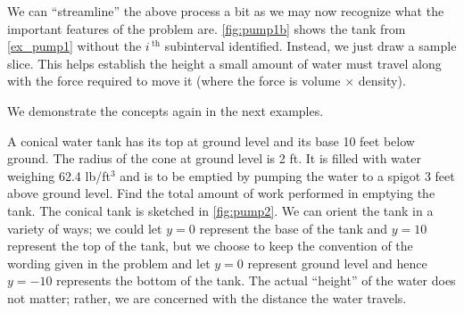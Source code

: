 We can ``streamline'' the above process a bit as we may now recognize what the important features of the problem are. \autoref{fig:pump1b} shows the tank from \autoref{ex_pump1} without the $i\,^\text{th}$ subinterval identified. Instead, we just draw a sample slice. This helps establish the height a small amount of water must travel along with the force required to move it (where the force is volume $\times$ density).

We demonstrate the concepts again in the next examples.

\begin{example}\label{ex_pump2}%
A conical water tank has its top at ground level and its base 10 feet below ground. The radius of the cone at ground level is 2 ft. It is filled with water weighing 62.4 lb/ft$^3$ and is to be emptied by pumping the water to a spigot 3 feet above ground level. Find the total amount of work performed in emptying the tank.
\solution
The conical tank is sketched in \autoref{fig:pump2}. We can orient the tank in a variety of ways; we could let $y=0$ represent the base of the tank and $y=10$ represent the top of the tank, but we choose to keep the convention of the wording given in the problem and let $y=0$ represent ground level and hence $y=-10$ represents the bottom of the tank. The actual ``height'' of the water does not matter; rather, we are concerned with the distance the water travels. 



\end{example}
